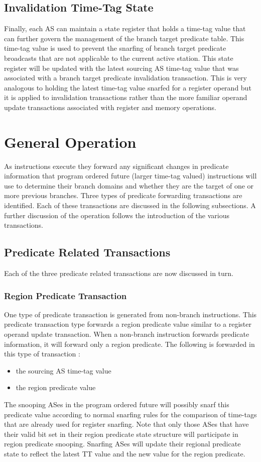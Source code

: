 \documentclass[10pt,dvips]{article}
\begin{document}
\subsection{Invalidation Time-Tag State}
%
Finally, each AS can maintain a state register that holds
a time-tag value that can further govern the management of
the branch target predicate table.
This time-tag value is used to prevent the snarfing of
branch target predicate broadcasts that are not applicable to the
current active station.  This state register will be updated
with the latest sourcing AS time-tag value that was associated with 
a branch target predicate invalidation transaction.
This is very analogous to holding the latest time-tag
value snarfed for a register operand but it is applied to
invalidation transactions rather than the more familiar operand
update transactions associated with register and memory operations.
%
\section{General Operation}
%
As instructions execute they forward any significant changes in
predicate information that program ordered future (larger
time-tag valued) instructions will
use to determine their branch domains and whether they are the target of
one or more previous branches.  Three types of predicate forwarding
transactions are identified.  Each of these transactions are
discussed in the following subsections.
A further discussion of the operation follows the introduction
of the various transactions.
%
\subsection{Predicate Related Transactions}
%
Each of the three predicate related transactions
are now discussed in turn.
%
\subsubsection{Region Predicate Transaction}
%
One type of predicate transaction is generated from non-branch instructions.
This predicate transaction type forwards a region predicate value
similar to a register operand update transaction.
When a
non-branch instruction forwards predicate information, it will forward
only a region predicate.  
The following is forwarded in this type of transaction :
%
\begin{itemize}
\item{the sourcing AS time-tag value}
\item{the region predicate value}
\end{itemize}   
%
The snooping ASes in the program ordered future will possibly
snarf this predicate value according to normal snarfing rules for the
comparison of time-tags that are already used for register snarfing.
Note that only those ASes that have their valid bit set in their
region predicate state structure will participate in
region predicate snooping.
Snarfing ASes will update their regional predicate state to reflect the
latest TT value and the new value for the region predicate.  
%
\end{document}
